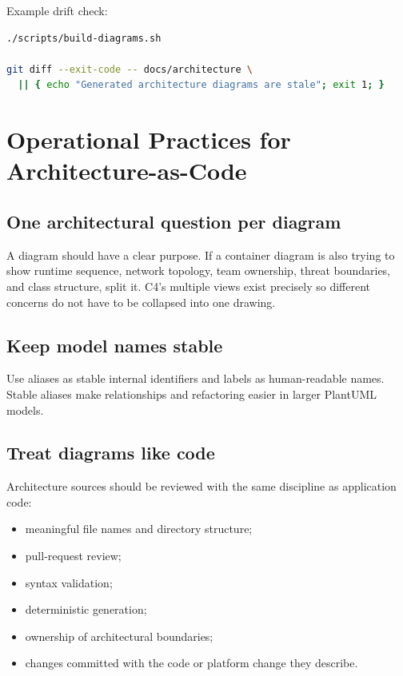 \documentclass[11pt]{article}
\begin{document}
Example drift check:

\begin{lstlisting}[language=bash]
./scripts/build-diagrams.sh

git diff --exit-code -- docs/architecture \
  || { echo "Generated architecture diagrams are stale"; exit 1; }
\end{lstlisting}

\section{Operational Practices for Architecture-as-Code}

\subsection{One architectural question per diagram}

A diagram should have a clear purpose. If a container diagram is also trying to show runtime sequence, network topology, team ownership, threat boundaries, and class structure, split it. C4's multiple views exist precisely so different concerns do not have to be collapsed into one drawing.

\subsection{Keep model names stable}

Use aliases as stable internal identifiers and labels as human-readable names. Stable aliases make relationships and refactoring easier in larger PlantUML models.

\subsection{Treat diagrams like code}

Architecture sources should be reviewed with the same discipline as application code:
\begin{itemize}
  \item meaningful file names and directory structure;
  \item pull-request review;
  \item syntax validation;
  \item deterministic generation;
  \item ownership of architectural boundaries;
  \item changes committed with the code or platform change they describe.
\end{itemize}
\end{document}
